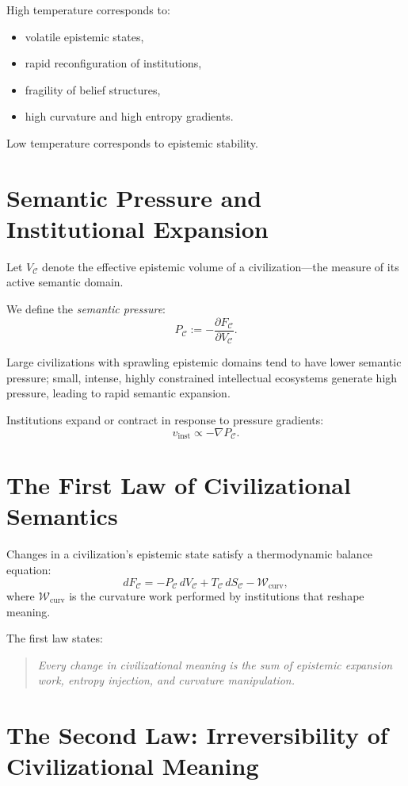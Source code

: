 High temperature corresponds to:

\begin{itemize}
\item volatile epistemic states,  
\item rapid reconfiguration of institutions,  
\item fragility of belief structures,  
\item high curvature and high entropy gradients.
\end{itemize}

Low temperature corresponds to epistemic stability.

\section{Semantic Pressure and Institutional Expansion}

Let $V_{\mathcal{C}}$ denote the effective epistemic volume of a
civilization---the measure of its active semantic domain.

We define the \emph{semantic pressure}:
\[
P_{\mathcal{C}} := -\frac{\partial F_{\mathcal{C}}}{\partial V_{\mathcal{C}}}.
\]

Large civilizations with sprawling epistemic domains tend to have lower
semantic pressure; small, intense, highly constrained intellectual
ecosystems generate high pressure, leading to rapid semantic expansion.

Institutions expand or contract in response to pressure gradients:
\[
v_{\mathrm{inst}} \propto -\nabla P_{\mathcal{C}}.
\]

\section{The First Law of Civilizational Semantics}

Changes in a civilization’s epistemic state satisfy a thermodynamic
balance equation:
\[
dF_{\mathcal{C}}
  = -P_{\mathcal{C}}\, dV_{\mathcal{C}}
    + T_{\mathcal{C}}\, dS_{\mathcal{C}}
    - \mathcal{W}_{\mathrm{curv}},
\]
where $\mathcal{W}_{\mathrm{curv}}$ is the curvature work performed by
institutions that reshape meaning.

The first law states:
\begin{quote}
\emph{Every change in civilizational meaning is the sum of epistemic
expansion work, entropy injection, and curvature manipulation.}
\end{quote}

\section{The Second Law: Irreversibility of Civilizational Meaning}

